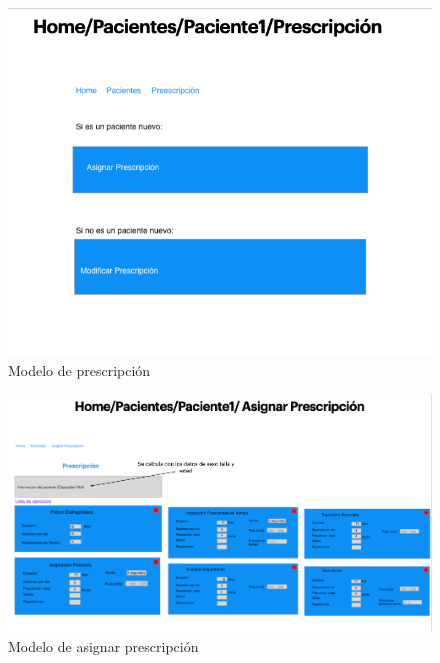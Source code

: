 \documentclass[12pt]{article}
\begin{document}
\begin{figure}[ht]
\centering
\includegraphics[scale=0.4]{imag/P6.png}
\caption{Modelo de prescripción  }
\label{6}
\end{figure}
\FloatBarrier


\begin{figure}[ht]
\centering
\includegraphics[scale=0.4]{imag/P7.png}
\caption{Modelo de asignar prescripción }
\label{6}
\end{figure}
\FloatBarrier
\end{document}
